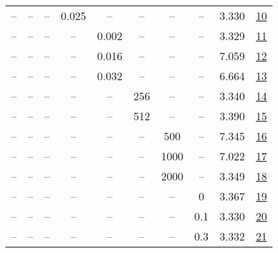\begin{table}[H]
\begin{tabular}{cccccccccc}
-- & -- & -- & 0.025 & -- & -- & -- & -- & 3.330 & \href{https://wandb.ai/stanford-mercury/optimizer-scaling/runs/sweep-130m-10B-sophiam032e0dlr0.004-wd0.2-minlr0-warmup4000-b10.-b9dfba}{10} \\
-- & -- & -- & -- & 0.002 & -- & -- & -- & 3.329 & \href{https://wandb.ai/stanford-mercury/optimizer-scaling/runs/sweep-130m-10B-sophiam3685d5lr0.002-wd0.2-minlr0-warmup4000-b10.-f1e565}{11} \\
-- & -- & -- & -- & 0.016 & -- & -- & -- & 7.059 & \href{https://wandb.ai/stanford-mercury/optimizer-scaling/runs/sweep-130m-10B-sophiam684f24lr0.016-wd0.2-minlr0-warmup4000-b10.-6d1fe0}{12} \\
-- & -- & -- & -- & 0.032 & -- & -- & -- & 6.664 & \href{https://wandb.ai/stanford-mercury/optimizer-scaling/runs/sweep-130m-10B-sophiam3beb76lr0.032-wd0.2-minlr0-warmup4000-b10.-31de08}{13} \\
-- & -- & -- & -- & -- & 256 & -- & -- & 3.340 & \href{https://wandb.ai/stanford-mercury/optimizer-scaling/runs/sweep-130m-10B-sophiam060b57lr0.004-wd0.2-minlr0-warmup4000-b10.-f3b5aa}{14} \\
-- & -- & -- & -- & -- & 512 & -- & -- & 3.390 & \href{https://wandb.ai/stanford-mercury/optimizer-scaling/runs/sweep-130m-10B-sophiam2211e4lr0.004-wd0.2-minlr0-warmup4000-b10.-f633bb}{15} \\
-- & -- & -- & -- & -- & -- & 500 & -- & 7.345 & \href{https://wandb.ai/stanford-mercury/optimizer-scaling/runs/sweep-130m-10B-sophiamcb63d7lr0.004-wd0.2-minlr0-warmup500-b10.9-ad427c}{16} \\
-- & -- & -- & -- & -- & -- & 1000 & -- & 7.022 & \href{https://wandb.ai/stanford-mercury/optimizer-scaling/runs/sweep-130m-10B-sophiama20637lr0.004-wd0.2-minlr0-warmup1000-b10.-8ef81c}{17} \\
-- & -- & -- & -- & -- & -- & 2000 & -- & 3.349 & \href{https://wandb.ai/stanford-mercury/optimizer-scaling/runs/sweep-130m-10B-sophiam6051c1lr0.004-wd0.2-minlr0-warmup2000-b10.-3ac3ce}{18} \\
-- & -- & -- & -- & -- & -- & -- & 0 & 3.367 & \href{https://wandb.ai/stanford-mercury/optimizer-scaling/runs/sweep-130m-10B-sophiam0dbf87lr0.004-wd0-minlr0-warmup4000-b10.95-18f4fc}{19} \\
-- & -- & -- & -- & -- & -- & -- & 0.1 & 3.330 & \href{https://wandb.ai/stanford-mercury/optimizer-scaling/runs/sweep-130m-10B-sophiam0ca1f6lr0.004-wd0.1-minlr0-warmup4000-b10.-810b8d}{20} \\
-- & -- & -- & -- & -- & -- & -- & 0.3 & 3.332 & \href{https://wandb.ai/stanford-mercury/optimizer-scaling/runs/sweep-130m-10B-sophiam1a4eb8lr0.004-wd0.3-minlr0-warmup4000-b10.-c20359}{21} \\
\bottomrule
\end{tabular}
\end{table}

